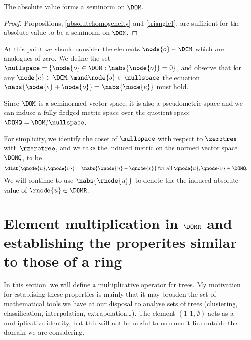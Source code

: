 \begin{corollary}\label{gseminorm}
  The absolute value forms a seminorm on $\DOM$.
  \begin{proof}  
    Propositions, \ref{absolutehomogeneity} and \ref{triangle1}, are 
    sufficient for the absolute value to be a seminorm on
    $\DOM$.
  \end{proof}
\end{corollary}

At this point we should consider the elements
$\node{o} \in \DOM$
which are analogues of zero. We define the set
$\nullspace =\{\node{o}\in\DOM: \nabs{\node{o}} = 0\}$,
and observe that for any
$\node{e} \in \DOM, \mand \node{o} \in \nullspace$
the equation
$\nabs{\node{e} + \node{o}} = \nabs{\node{e}}$
must hold. 

Since $\DOM$ is a seminormed vector space, it is also a pseudometric
space and we can induce a fully fledged metric space over the quotient
space $\DOMQ = \DOM / \nullspace$.

For simplicity, we identify the coset of $\nullspace$ with respect to
$\zerotree$ with $\rzerotree$, and we take the induced metric on the
normed vector space $\DOMQ$, to be
\[\dist(\qnode{u},\qnode{v}) =
\nabs{\qnode{u} - \qnode{v}} \text{ for all }\qnode{u}, \qnode{v} \in
\DOMQ.\]  We will continue to use \(\nabs{\rnode{u}}\) to denote the
the induced absolute value of \(\rnode{u}\in\DOMR\).




\section{Element multiplication in $\DOMR$ and establishing the
  properites similar to those of a ring}

In this section, we will define a multiplicative operator for
trees. My motivation for establising these properties is mainly that
it may broaden the set of mathematical tools we have at our
disposal to analyse sets of trees (clustering, classification,
interpolation, extrapolation\ldots).  The element \((1,1,\emptyset)\)
acts as a multiplicative identity, but this will not be useful to us
since it lies outside the domain we are considering.

